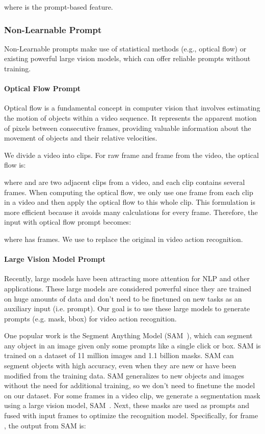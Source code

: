 \documentclass[letterpaper, 10 pt, conference]{ieeeconf}
\begin{document}
where  is the prompt-based feature.

\subsubsection{Non-Learnable Prompt}
Non-Learnable prompts make use of statistical methods (e.g., optical flow) or existing powerful large vision models, which can offer reliable prompts without training. 
\paragraph{Optical Flow Prompt}
Optical flow is a fundamental concept in computer vision that involves estimating the motion of objects within a video sequence. It represents the apparent motion of pixels between consecutive frames, providing valuable information about the movement of objects and their relative velocities. 

We divide a video into  clips. For raw frame  and frame  from the video, the optical flow is:
 
where  and  are two adjacent clips from a video, and each clip contains several frames. When computing the optical flow, we only use one frame from each clip in a video and then apply the optical flow to this whole clip. This formulation is more efficient because it avoids many calculations for every frame. Therefore, the input with optical flow prompt becomes:
 
 where  has  frames. We use  to replace the original  in video action recognition. 
 
\paragraph{Large Vision Model Prompt}

Recently, large models have been attracting more attention for NLP and other applications.  These large models are considered powerful since they are trained on huge amounts of data and don't need to be finetuned on new tasks as an auxiliary input (i.e. prompt). Our goal is to use these large models to generate prompts (e.g. mask, bbox) for video action recognition. 

One popular work is the Segment Anything Model (SAM~\cite{kirillov2023segment}), which can segment any object in an image given only some prompts like a single click or box. SAM is trained on a dataset of 11 million images and 1.1 billion masks. SAM can segment objects with high accuracy, even when they are new or have been modified from the training data. SAM generalizes to new objects and images without the need for additional training, so we don't need to finetune the model on our dataset. For some frames in a video clip, we generate a segmentation mask using a large vision model, SAM~\cite{kirillov2023segment}. Next, these masks are used as prompts and fused with input frames to optimize the recognition model. Specifically, for frame , the output from SAM is:
 
\end{document}
